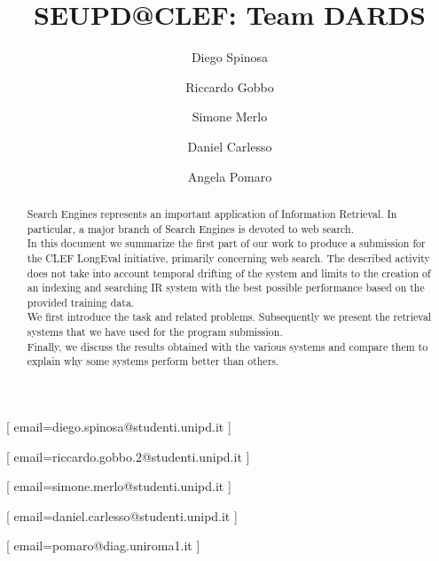 \documentclass{ceurart}
\begin{document}


\title{SEUPD@CLEF: Team DARDS}

\author[1]{Diego Spinosa}[%
email=diego.spinosa@studenti.unipd.it
]

\author[1]{Riccardo Gobbo}[%
email=riccardo.gobbo.2@studenti.unipd.it
]

\author[1]{Simone Merlo}[%
email=simone.merlo@studenti.unipd.it
]

\author[1]{Daniel Carlesso}[%
email=daniel.carlesso@studenti.unipd.it
]

\author[1,2]{Angela Pomaro}[%
email=pomaro@diag.uniroma1.it
]

\address[1]{University of Padua, Italy}
\address[2] {University of Rome La Sapienza, Italy}


\begin{abstract}
    Search Engines represents an important application of Information Retrieval. In particular, a major branch of Search Engines is devoted to web search.
    \\
    In this document we summarize the first part of our work to produce a submission for the CLEF LongEval initiative, primarily concerning web search. The described activity does not take into account temporal drifting of the system and limits to the creation of an indexing and searching IR system with the best possible performance based on the provided training data.
    \\
    We first introduce the task and related problems. Subsequently we present the retrieval systems that we have used for the program submission.
    \\
    Finally, we discuss the results obtained with the various systems and compare them to explain why some systems perform better than others.
\end{abstract}
\end{document}
